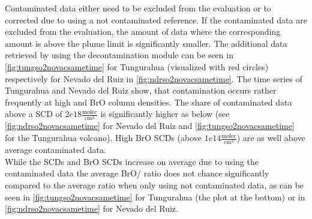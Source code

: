 \documentclass  [
  paper    = a4,
  BCOR     = 10mm,
  twoside,
  fontsize = 12pt,
  fleqn,
  toc      = bibnumbered,
  toc      = listofnumbered,
  numbers  = noendperiod,
  headings = normal,
  listof   = leveldown,
  version  = 3.03
]                                       {scrreprt}
\begin{document}
%
Contaminated data either need to be excluded from the evaluation or to corrected due to using a not contaminated reference. If the contaminated data are excluded from the evaluation, the amount of data where the corresponding  amount is above the plume limit is significantly smaller. The additional data retrieved by using the decontamination module can be seen in \cref{fig:tungso2novacsametime} for Tungurahua (visualized with red circles) respectively for Nevado del Ruiz in \cref{fig:ndrso2novacsametime}.
The time series of Tungurahua and Nevado del Ruiz show, that contamination occurs rather frequently at high  and BrO column densities. The share of contaminated data above a  SCD of $2e18\frac{\text{molec}}{\text{cm}^2}$ is significantly higher as below (see \cref{fig:ndrso2novacsametime} for Nevado del Ruiz and \cref{fig:tungso2novacsametime} for the Tungurahua volcano). High BrO SCDs (above $1e14\frac{\text{molec}}{\text{cm}^2}$) are as well above average contaminated data.\\
While the  SCDs and BrO SCDs increase on average due to using the contaminated data the average BrO/ ratio does not chance significantly compared to the average ratio when only using not contaminated data, as can be seen in \cref{fig:tungso2novacsametime} for Tungurahua (the plot at the bottom) or in \cref{fig:ndrso2novacsametime} for Nevado del Ruiz.\\


\end{document}
